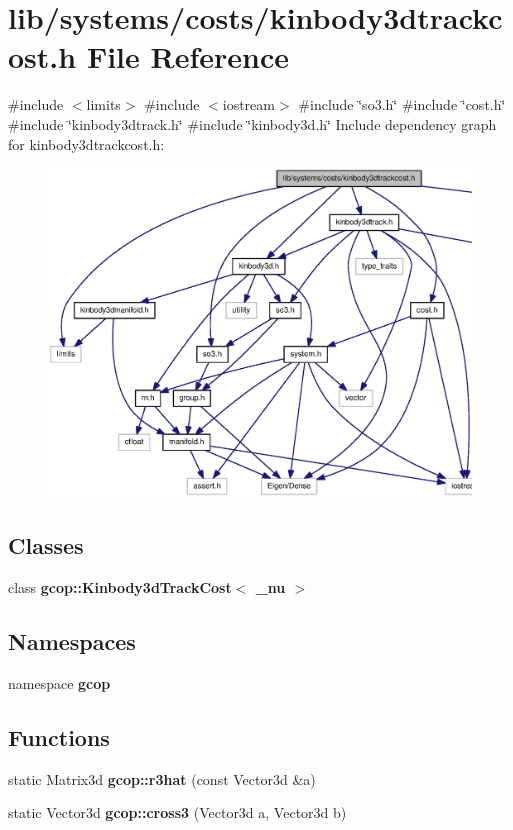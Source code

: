 \section{lib/systems/costs/kinbody3dtrackcost.h \-File \-Reference}
\label{kinbody3dtrackcost_8h}
{\ttfamily \#include $<$limits$>$}\*
{\ttfamily \#include $<$iostream$>$}\*
{\ttfamily \#include \char`\"{}so3.\-h\char`\"{}}\*
{\ttfamily \#include \char`\"{}cost.\-h\char`\"{}}\*
{\ttfamily \#include \char`\"{}kinbody3dtrack.\-h\char`\"{}}\*
{\ttfamily \#include \char`\"{}kinbody3d.\-h\char`\"{}}\*
\-Include dependency graph for kinbody3dtrackcost.\-h\-:\nopagebreak
\begin{figure}[H]
\begin{center}
\leavevmode
\includegraphics[width=350pt]{kinbody3dtrackcost_8h__incl}
\end{center}
\end{figure}
\subsection*{\-Classes}
\begin{DoxyCompactItemize}
\item 
class {\bf gcop\-::\-Kinbody3d\-Track\-Cost$<$ \-\_\-nu $>$}
\end{DoxyCompactItemize}
\subsection*{\-Namespaces}
\begin{DoxyCompactItemize}
\item 
namespace {\bf gcop}
\end{DoxyCompactItemize}
\subsection*{\-Functions}
\begin{DoxyCompactItemize}
\item 
static \-Matrix3d {\bf gcop\-::r3hat} (const \-Vector3d \&a)
\item 
static \-Vector3d {\bf gcop\-::cross3} (\-Vector3d a, \-Vector3d b)
\end{DoxyCompactItemize}
